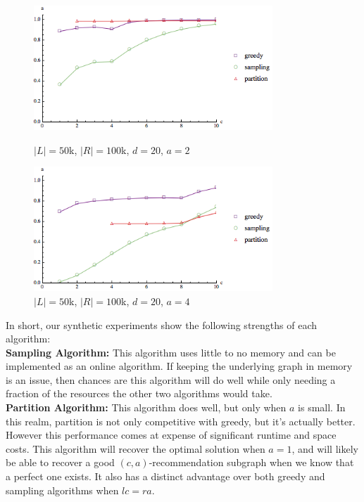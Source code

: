 \begin{figure}[t]
\centering
\begin{minipage}[h]{0.48\textwidth}
\centering
\includegraphics[width=0.8\textwidth]{images/l=50000,r=100000,a=2_Greedy_vs_Naive.png}
\caption{$|L|=50$k, $|R|=100$k, $d=20$, $a=2$}\label{fig:a=2}
\end{minipage}
\hspace{0cm}
\begin{minipage}[h]{0.48\textwidth}
\centering
\includegraphics[width=0.8\textwidth]{images/l=50000,r=100000,a=4_Greedy_vs_Naive.png}
\caption{$|L|=50$k, $|R|=100$k, $d=20$, $a=4$}\label{fig:a=4}
\end{minipage}
\vspace{-0.2in}
\end{figure}

\vs
In short, our synthetic experiments show the following strengths of each algorithm:\\

\textbf{Sampling Algorithm:} This algorithm uses little to no memory and can
be implemented as an online algorithm. If keeping the underlying graph in
memory is an issue, then chances are this algorithm will do well while only needing
a fraction of the resources the other two algorithms would take.\\

\textbf{Partition Algorithm:} This algorithm does well, but only when $a$ is small. In this
realm, partition is not only competitive with greedy, but it's actually better. However
this performance comes at expense of significant runtime and space costs. This algorithm
will recover the  optimal solution when $a=1$, and will likely be able to recover a
good $(c,a)$-recommendation subgraph when we know that a perfect one exists. It also has
a distinct advantage over both greedy and sampling algorithms when $lc=ra$. \\

